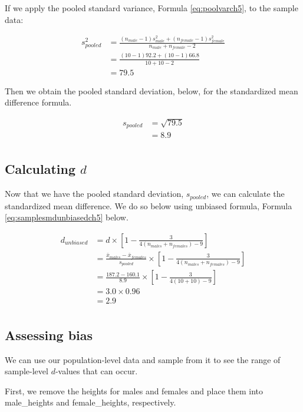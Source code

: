\documentclass[
]{krantz}
\begin{document}
If we apply the pooled standard variance, Formula \eqref{eq:poolvarch5}, to the sample data:

\[
\begin{aligned}
s_{pooled}^2 &= \frac{(n_{male} -1)s_{male}^2 + (n_{female} -1)s_{female}^2}{n_{male} + n_{female}-2} \\
&= \frac{(10 -1)92.2 + (10 -1)66.8}{10 + 10 -2} \\
&= 79.5
\end{aligned}
\]

Then we obtain the pooled standard deviation, below, for the standardized mean difference formula.

\[
\begin{aligned} 
s_{pooled}  &= \sqrt{79.5} \\
&= 8.9\\
\end{aligned} 
\]

\hypertarget{calculating-d}{%
\subsection{\texorpdfstring{Calculating \(d\)}{Calculating d}}\label{calculating-d}}

Now that we have the pooled standard deviation, \(s_{pooled}\), we can calculate the standardized mean difference. We do so below using unbiased formula, Formula \eqref{eq:samplesmdunbiasedch5} below.

\[
\begin{aligned}
d_{unbiased}  &= d \times [1 - \frac{3}{4(n_{males} + n_{females})-9}] \\
&= \frac{\bar{x}_{males} - \bar{x}_{females}}{s_{pooled}} \times [1 - \frac{3}{4(n_{males} + n_{females})-9}] \\
&= \frac{187.2 - 160.1}{8.9} \times [1 - \frac{3}{4(10 + 10)-9}] \\
&= 3.0 \times 0.96\\
&= 2.9\\
\end{aligned}
\]

\hypertarget{assessing-bias}{%
\subsection{Assessing bias}\label{assessing-bias}}

We can use our population-level data and sample from it to see the range of sample-level \(d\)-values that can occur.

First, we remove the heights for males and females and place them into male\_heights and female\_heights, respectively.
\end{document}

